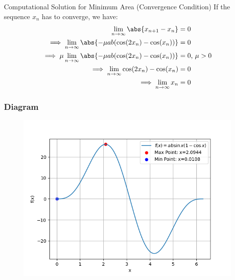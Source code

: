 \documentclass{beamer}
\begin{document}
	\begin{frame}{Computational Solution for Minimum Area (Convergence Condition)}
		If the sequence $x_n$ has to converge, we have:
		\begin{align}
			\lim_{n \to \infty} \abs{x_{n + 1} - x_n} &= 0 \\
			\implies \lim_{n \to \infty} \abs{-{\mu}ab(\cos(2x_{n}) - \cos(x_{n}))} &= 0 \\
			\implies \mu \lim_{n \to \infty} \abs{-{\mu}ab(\cos(2x_{n}) - \cos(x_{n}))} &= 0 \text{, } \mu > 0 \\
			\implies \lim_{n \to \infty} \cos(2x_{n}) - \cos(x_{n}) &= 0 \\
			\implies \lim_{n \to \infty} x_{n} &= 0
		\end{align}
	\end{frame}
	\begin{frame}
		\frametitle{Diagram}
		\begin{figure}[!ht]
			\centering
			\includegraphics[width=\linewidth]{figs/Fig.png}
		\end{figure}
	\end{frame}
\end{document}
